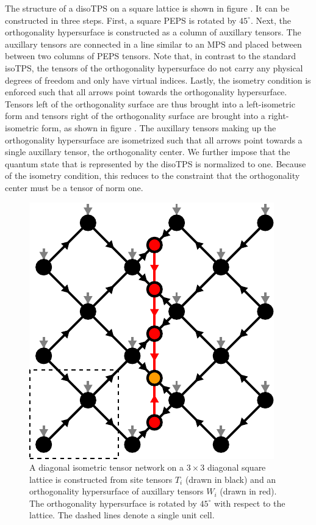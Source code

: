 The structure of a disoTPS on a square lattice is shown in figure . It can be constructed in three steps. First, a square PEPS is rotated by $45^\circ$. Next, the orthogonality hypersurface is constructed as a column of auxillary tensors. The auxillary tensors are connected in a line similar to an MPS and placed between between two columns of PEPS tensors. Note that, in contrast to the standard isoTPS, the tensors of the orthogonality hypersurface do not carry any physical degrees of freedom and only have virtual indices. Lastly, the isometry condition is enforced such that all arrows point towards the orthogonality hypersurface. Tensors left of the orthogonality surface are thus brought into a left-isometric form and tensors right of the orthogonality surface are brought into a right-isometric form, as shown in figure . The auxillary tensors making up the orthogonality hypersurface are isometrized such that all arrows point towards a single auxillary tensor, the orthogonality center. We further impose that the quantum state that is represented by the disoTPS is normalized to one. Because of the isometry condition, this reduces to the constraint that the orthogonality center must be a tensor of norm one.\par
\begin{figure}[h]
	\centering
	\includegraphics[scale=1]{figures/tikz/disoTPS/disoTPS_structure/disoTPS_structure.pdf}
	\caption{A diagonal isometric tensor network on a $3\times3$ diagonal square lattice is constructed from site tensors $T_i$ (drawn in black) and an orthogonality hypersurface of auxillary tensors $W_i$ (drawn in red). The orthogonality hypersurface is rotated by $45^\circ$ with respect to the lattice. The dashed lines denote a single unit cell.}
	\label{fig:disoTPS_structure}
\end{figure}
